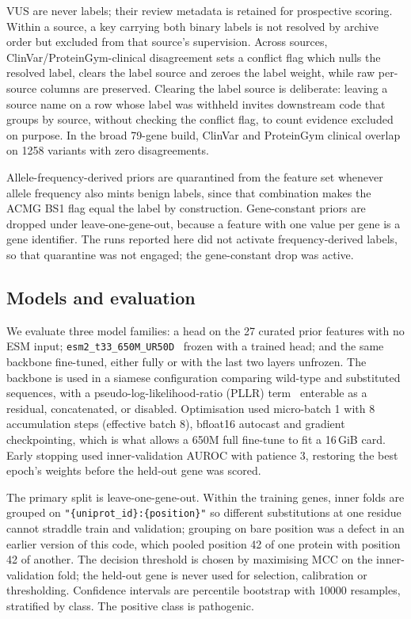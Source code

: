 \documentclass{bioinfo}
\begin{document}
VUS are never labels; their review metadata is retained for prospective
scoring. Within a source, a key carrying both binary labels is not resolved by
archive order but excluded from that source's supervision. Across sources,
ClinVar/ProteinGym-clinical disagreement sets a conflict flag which nulls the
resolved label, clears the label source and zeroes the label weight, while raw
per-source columns are preserved. Clearing the label source is deliberate:
leaving a source name on a row whose label was withheld invites downstream code
that groups by source, without checking the conflict flag, to count evidence
excluded on purpose. In the broad 79-gene build, ClinVar and ProteinGym clinical
overlap on \num{1258} variants with zero disagreements.

Allele-frequency-derived priors are quarantined from the feature set whenever
allele frequency also mints benign labels, since that combination makes the
ACMG BS1 flag equal the label by construction. Gene-constant priors are dropped
under leave-one-gene-out, because a feature with one value per gene is a gene
identifier. The runs reported here did not activate frequency-derived labels,
so that quarantine was not engaged; the gene-constant drop was active.

\subsection{Models and evaluation}

We evaluate three model families: a head on the 27 curated prior features with
no ESM input; \texttt{esm2\_t33\_650M\_UR50D}~\cite{lin2023esm2} frozen with a trained head; and
the same backbone fine-tuned, either fully or with the last two layers
unfrozen. The backbone is used in a siamese configuration comparing wild-type
and substituted sequences, with a pseudo-log-likelihood-ratio (PLLR) term~\cite{meier2021pllr}
enterable as a residual, concatenated, or disabled. Optimisation used
micro-batch 1 with 8 accumulation steps (effective batch 8), bfloat16 autocast
and gradient checkpointing, which is what allows a 650M full fine-tune to fit a
16\,GiB card. Early stopping used inner-validation AUROC with patience 3,
restoring the best epoch's weights before the held-out gene was scored.

The primary split is leave-one-gene-out. Within the training genes, inner folds
are grouped on \texttt{"\{uniprot\_id\}:\{position\}"} so different
substitutions at one residue cannot straddle train and validation; grouping on
bare position was a defect in an earlier version of this code, which pooled
position 42 of one protein with position 42 of another. The decision threshold
is chosen by maximising MCC on the inner-validation fold; the held-out gene is
never used for selection, calibration or thresholding. Confidence intervals are
percentile bootstrap with \num{10000} resamples, stratified by class. The
positive class is pathogenic.
\end{document}
